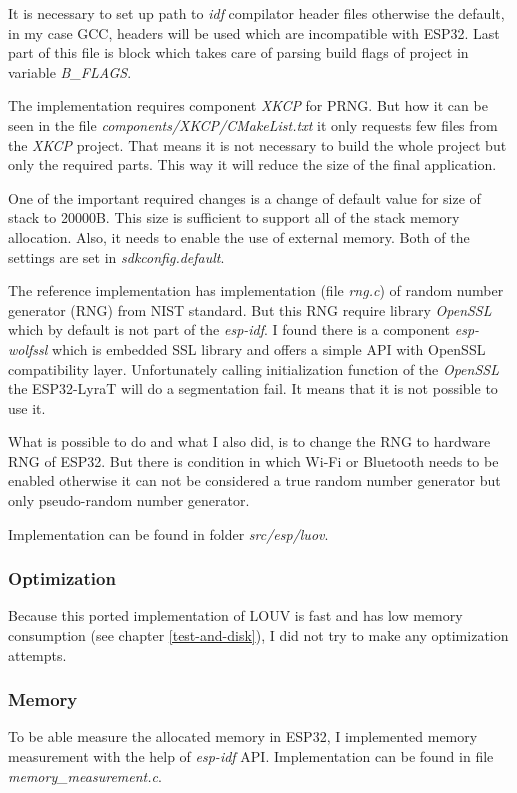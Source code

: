 \documentclass[thesis=M,english]{FITthesis}[2019/12/23]
\begin{document}
\noindent
It is necessary to set up path to \textit{idf} compilator header files otherwise the default, in my case GCC, headers will be used which are incompatible with ESP32.
Last part of this file is block which takes care of parsing build flags of project in variable \textit{B\_FLAGS}. 

\bigskip
\noindent
The implementation requires component \textit{XKCP} for PRNG. But how it can be seen in the file \textit{components/XKCP/CMakeList.txt} it only requests few files from the \textit{XKCP} project. That means it is not necessary to build the whole project but only the required parts. This way it will reduce the size of the final application. 

\bigskip
\noindent
One of the important required changes is a change of default value for size of stack to 20000B. This size is sufficient to support all of the stack memory allocation. Also, it needs to enable the use of external memory. Both of the settings are set in \textit{sdkconfig.default}.

\bigskip
\noindent
The reference implementation has implementation (file \textit{rng.c}) of random number generator (RNG) from NIST standard. But this RNG require library \textit{OpenSSL} which by default is not part of the \textit{esp-idf}. I found there is a component \textit{esp-wolfssl} which is embedded SSL library and offers a simple API with OpenSSL compatibility layer. Unfortunately calling initialization function of the \textit{OpenSSL} the ESP32-LyraT will do a segmentation fail. It means that it is not possible to use it.

\bigskip
\noindent
What is possible to do and what I also did, is to change the RNG to hardware RNG of ESP32. But there is condition in which Wi-Fi or Bluetooth needs to be enabled otherwise it can not be considered a true random number generator but only pseudo-random number generator.

\bigskip
\noindent
Implementation can be found in folder \textit{src/esp/luov}. 

\subsubsection{Optimization}
Because this ported implementation of LOUV is fast and has low memory consumption (see chapter \ref{test-and-disk}), I did not try to make any optimization attempts. 

\subsubsection{Memory} \label{esp-luov-memory}
To be able measure the allocated memory in ESP32, I implemented memory measurement with the help of \textit{esp-idf} API. Implementation can be found in file \textit{memory\_measurement.c}.
\end{document}
